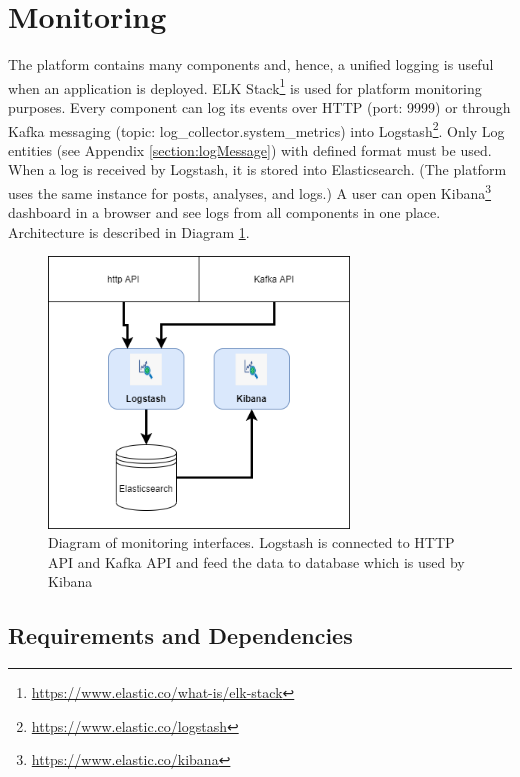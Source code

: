 \section{Monitoring}\label{section:monitoring}

The platform contains many components and, hence, a unified logging is useful when an application is deployed. ELK Stack\footnote{\url{https://www.elastic.co/what-is/elk-stack}} is used for platform monitoring purposes. Every component can log its events over HTTP (port: 9999) or through Kafka messaging (topic: log\_collector.system\_metrics) into Logstash\footnote{\url{https://www.elastic.co/logstash}}. Only Log entities (see Appendix \ref{section:logMessage}) with defined format must be used. When a log is received by Logstash, it is stored into Elasticsearch. (The platform uses the same instance for posts, analyses, and logs.) A user can open Kibana\footnote{\url{https://www.elastic.co/kibana}} dashboard in a browser and see logs from all components in one place. Architecture is described in Diagram \ref{figure:monitoring-diagram}.

\begin{figure}[H]
\centering
\includegraphics[width=8cm]{diagrams/socneto-metrics.png}
\caption{Diagram of monitoring interfaces. Logstash is connected to HTTP API and Kafka API and feed the data to database which is used by Kibana}
\label{figure:monitoring-diagram}
\end{figure}

\subsection{Requirements and Dependencies}

